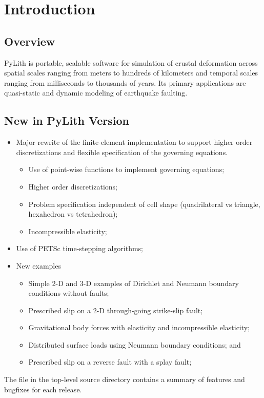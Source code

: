 \chapter{Introduction}


\section{Overview}

PyLith is portable, scalable software for simulation of crustal
deformation across spatial scales ranging from meters to hundreds of
kilometers and temporal scales ranging from milliseconds to thousands
of years. Its primary applications are quasi-static and dynamic
modeling of earthquake faulting.

\section{New in PyLith Version \pylithVersionNumber}
\begin{itemize}
\item Major rewrite of the finite-element implementation to support
  higher order discretizations and flexible specification of the
  governing equations.
  \begin{itemize}
  \item Use of point-wise functions to implement governing equations;
  \item Higher order discretizations;
  \item Problem specification independent of cell shape (quadrilateral
    vs triangle, hexahedron vs tetrahedron);
  \item Incompressible elasticity;
  \end{itemize}
\item Use of PETSc time-stepping algorithms;
\item New examples
  \begin{itemize}
  \item Simple 2-D and 3-D examples of Dirichlet and Neumann boundary
    conditions without faults;
  \item Prescribed slip on a 2-D through-going strike-slip fault;
  \item Gravitational body forces with elasticity and incompressible
    elasticity;
  \item Distributed surface loads using Neumann boundary conditions;
    and
  \item Prescribed slip on a reverse fault with a splay fault;
  \end{itemize}
\end{itemize}
The  file in the top-level source directory contains
a summary of features and bugfixes for each release.


